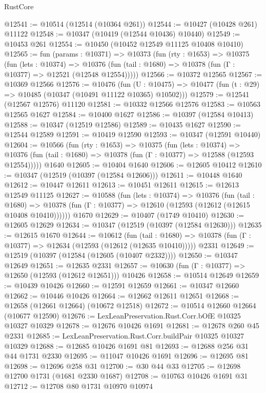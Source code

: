 \begin{lexlean}{RustCore}
\begin{coremodule}
@12541 := @10514 (@12514 (@10364 @261))
@12544 := @10427 (@10428 @261) @11122
@12548 := @10347 (@10419 (@12544 @10436) @10440)
@12549 := @10453 @261
@12554 := @10450 (@10452 @12549 @11125 @10408 @10410)
@12565 := fun (params : @10371) =>
  @10373
    (fun (rty : @1653) =>
    @10375
      (fun (lets : @10374) =>
      @10376 (fun (tail : @1680) => @10378 (fun (Γ : @10377) => @12521 (@12548 @12554)))))
@12566 := @10372 @12565
@12567 := @10369 @12566
@12576 := @10476
    (fun (U : @10475) => @10477 (fun (t : @29) => @10485 (@10347 (@10491 @11122 @10365) @10502)))
@12579 := @12541 (@12567 @12576) @11120
@12581 := @10332 @12566 @12576
@12583 := @10563 @12565 @1627
@12584 := @10400 @1627
@12586 := @10397 (@12584 @10413)
@12588 := @10347 (@12519 @12586)
@12589 := @10435 @1627
@12590 := @12544 @12589
@12591 := @10419 @12590
@12593 := @10347 (@12591 @10440)
@12604 := @10566
    (fun (rty : @1653) =>
    @10375
      (fun (lets : @10374) =>
      @10376 (fun (tail : @1680) => @10378 (fun (Γ : @10377) => @12588 (@12593 @12554)))))
    @1640
@12605 := @10404 @1640
@12606 := @12605 @10412
@12610 := @10347 (@12519 (@10397 (@12584 @12606)))
@12611 := @10448 @1640
@12612 := @10447 @12611
@12613 := @10451 @12611
@12615 := @12613 @12549 @11125
@12627 := @10588
    (fun (lets : @10374) =>
    @10376
      (fun (tail : @1680) =>
      @10378 (fun (Γ : @10377) => @12610 (@12593 (@12612 (@12615 @10408 @10410))))))
    @1670
@12629 := @10407 (@1749 @10410)
@12630 := @12605 @12629
@12634 := @10347 (@12519 (@10397 (@12584 @12630)))
@12635 := @12615 @1670
@12644 := @10612
    (fun (tail : @1680) => @10378 (fun (Γ : @10377) => @12634 (@12593 (@12612 (@12635 @10410)))))
    @2331
@12649 := @12519 (@10397 (@12584 (@12605 (@10407 @2332))))
@12650 := @10347 @12649
@12651 := @12635 @2331
@12657 := @10630 (fun (Γ : @10377) => @12650 (@12593 (@12612 @12651))) @10426
@12658 := @10514 @12649
@12659 := @10439 @10426
@12660 := @12591 @12659
@12661 := @10347 @12660
@12662 := @10446 @10426
@12664 := @12662 @12611 @12651
@12668 := @12658 (@12661 @12664) (@10672 @12518)
@12672 := @10514 @12660 @12664 (@10677 @12590)
@12676 := LexLeanPreservation.Rust.Corr.bOfE @10325 @10327 @10329
@12678 := @12676 @10426 @1691
@12681 := @12678 @260 @45 @2331
@12685 := LexLeanPreservation.Rust.Corr.buildPair @10325 @10327 @10329
@12688 := @12685 @10426 @1691 @81
@12693 := @12688 @256 @31 @44 @1731 @2330
@12695 := @11047 @10426 @1691
@12696 := @12695 @81
@12698 := @12696 @258 @31
@12700 := @30 @44 @33
@12705 := @12698 @12700 @1731 (@1681 @2330 @1687)
@12708 := @10763 @10426 @1691 @31
@12712 := @12708 @80 @1731 @10970 @10974

\end{coremodule}
\end{lexlean}
